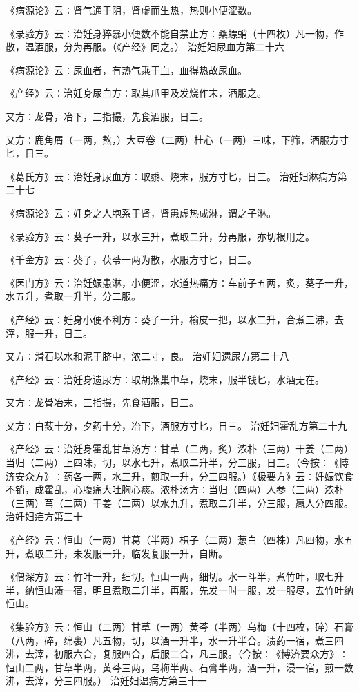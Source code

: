 \documentclass[a4paper,12pt,UTF8,twoside]{ctexbook}
\begin{document}
《病源论》云∶肾气通于阴，肾虚而生热，热则小便涩数。

《录验方》云∶治妊身猝暴小便数不能自禁止方∶桑螵蛸（十四枚）凡一物，作散，温酒服，分为再服。（《产经》同之。）
治妊妇尿血方第二十六

《病源论》云∶尿血者，有热气乘于血，血得热故尿血。

《产经》云∶治妊身尿血方∶取其爪甲及发烧作末，酒服之。

又方∶龙骨，冶下，三指撮，先食酒服，日三。

又方∶鹿角屑（一两，熬，）大豆卷（二两）桂心（一两）三味，下筛，酒服方寸匕，日三。

《葛氏方》云∶治妊身尿血方∶取黍、烧末，服方寸匕，日三。
治妊妇淋病方第二十七

《病源论》云∶妊身之人胞系于肾，肾患虚热成淋，谓之子淋。

《录验方》云∶葵子一升，以水三升，煮取二升，分再服，亦切根用之。

《千金方》云∶葵子，茯苓一两为散，水服方寸匕，日三。

《医门方》云∶治妊娠患淋，小便涩，水道热痛方∶车前子五两，炙，葵子一升，水五升，煮取一升半，分二服。

《产经》云∶妊身小便不利方∶葵子一升，榆皮一把，以水二升，合煮三沸，去滓，服一升，日三。

又方∶滑石以水和泥于脐中，浓二寸，良。
治妊妇遗尿方第二十八

《产经》云∶治妊身遗尿方∶取胡燕巢中草，烧末，服半钱匕，水酒无在。

又方∶龙骨冶末，三指撮，先食酒服，日三。

又方∶白蔹十分，夕药十分，冶下，酒服方寸匕，日三。
治妊妇霍乱方第二十九

《产经》云∶治妊身霍乱甘草汤方∶甘草（二两，炙）浓朴（三两）干姜（二两）当归（二两）上四味，切，以水七升，煮取二升半，分三服，日三。（今按∶《博济安众方》∶药各一两，水三升，煎取一升，分三四服。）《极要方》云∶妊娠饮食不销，成霍乱，心腹痛大吐胸心痰。浓朴汤方∶当归（四两）人参（三两）浓朴（三两）芎（二两）干姜（二两）以水九升，煮取二升半，分三服，羸人分四服。
治妊妇疟方第三十

《产经》云∶恒山（一两）甘葛（半两）枳子（二两）葱白（四株）凡四物，水五升，煮取二升，未发服一升，临发复服一升，自断。

《僧深方》云∶竹叶一升，细切。恒山一两，细切。水一斗半，煮竹叶，取七升半，纳恒山渍一宿，明旦煮取二升半，再服，先发一时一服，发一服尽，去竹叶纳恒山。

《集验方》云∶恒山（二两）甘草（一两）黄芩（半两）乌梅（十四枚，碎）石膏（八两，碎，绵裹）凡五物，切，以酒一升半，水一升半合。渍药一宿，煮三四沸，去滓，初服六合，复服四合，后服二合，凡三服。（今按∶《博济要众方》∶恒山二两，甘草半两，黄芩三两，乌梅半两、石膏半两，酒一升，浸一宿，煎一数沸，去滓，分三四服。）
治妊妇温病方第三十一
\end{document}
